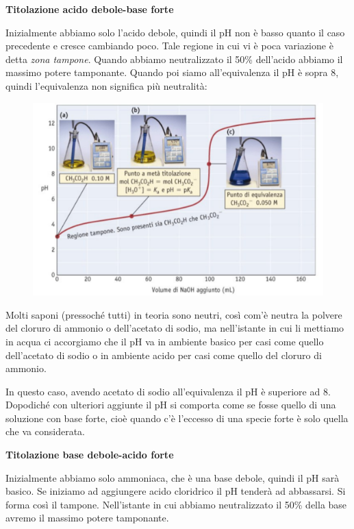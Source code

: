 \vspace{0.2cm}\textbf{Titolazione acido debole-base forte}

\vspace{0.2cm}Inizialmente abbiamo solo l'acido debole, quindi il pH non è basso quanto il caso precedente e cresce cambiando poco. Tale regione in cui vi è poca variazione è detta \textit{zona tampone}. Quando abbiamo neutralizzato il 50\% dell'acido abbiamo il massimo potere tamponante. Quando poi siamo all'equivalenza il pH è sopra 8, quindi l'equivalenza non significa più neutralità:

\begin{figure}[H]
    \centering
    \includegraphics[width=14cm]{immagini/titolazione_acido_debole_base_forte.png}
\end{figure}

Molti saponi (pressoché tutti) in teoria sono neutri, così com'è neutra la polvere del cloruro di ammonio o dell'acetato di sodio, ma nell'istante in cui li mettiamo in acqua ci accorgiamo che il pH va in ambiente basico per casi come quello dell'acetato di sodio o in ambiente acido per casi come quello del cloruro di ammonio.

In questo caso, avendo acetato di sodio all'equivalenza il pH è superiore ad 8. Dopodiché con ulteriori aggiunte il pH si comporta come se fosse quello di una soluzione con base forte, cioè quando c'è l'eccesso di una specie forte è solo quella che va considerata.

\vspace{0.2cm}\textbf{Titolazione base debole-acido forte}

\vspace{0.2cm}Inizialmente abbiamo solo ammoniaca, che è una base debole, quindi il pH sarà basico. Se iniziamo ad aggiungere acido cloridrico il pH tenderà ad abbassarsi. Si forma così il tampone. Nell'istante in cui abbiamo neutralizzato il 50\% della base avremo il massimo potere tamponante.

